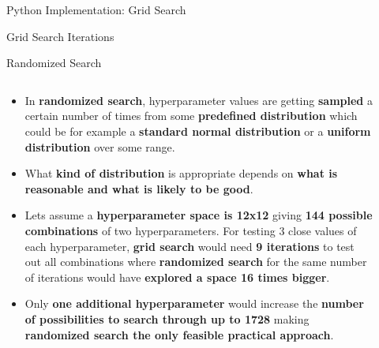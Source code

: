 \documentclass[document.tex]{subfiles}
\begin{document}
    \begin{frame}{Python Implementation: Grid Search}
        
    \end{frame}

    \begin{frame}{Grid Search Iterations}
        
    \end{frame}

    \begin{frame}{Randomized Search}
        \begin{columns}
            \begin{column}{.6\textwidth}
               \begin{itemize}
                    \item In \textbf{randomized search}, hyperparameter values are getting \textbf{sampled} a certain number of times from some \textbf{predefined distribution} which could be for example a \textbf{standard normal distribution} or a \textbf{uniform distribution} over some range.
                    \item What \textbf{kind of distribution} is appropriate depends on \textbf{what is reasonable and what is likely to be good}.
                    \item Lets assume a \textbf{hyperparameter space is 12x12} giving \textbf{144 possible combinations} of two hyperparameters. For testing 3 close values of each hyperparameter, \textbf{grid search} would need \textbf{9 iterations} to test out all combinations where \textbf{randomized search} for the same number of iterations would have \textbf{explored a space 16 times bigger}.
                    \item Only \textbf{one additional hyperparameter} would increase the \textbf{number of possibilities to search through up to 1728} making \textbf{randomized search the only feasible practical approach}.
                \end{itemize}
            \end{column}
            \begin{column}{.4\textwidth}
                \begin{figure}
                    \label{fig:hyperparameter-tuning-matrix}

\end{figure}
\end{column}
\end{columns}
\end{frame}
\end{document}
